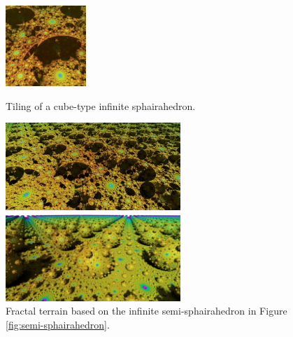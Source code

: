 \begin{figure}[h!tbp]
\begin{minipage}[t]{0.19\textwidth}
  \label{fig:terrainStep10}
 \end{minipage}
 \hspace*{\fill}
 \begin{minipage}[t]{0.19\textwidth}
  \centering
  \includegraphics[height=1.2in, keepaspectratio]{./img/application/sphairahedron/constructFractal/terrainProcess/final.jpg}
  \label{figsphairaPrismFinal}
 \end{minipage}
 \caption{Tiling of a cube-type infinite sphairahedron.}
 \label{fig:sphairahedralPrismTile}
\end{figure}

\begin{figure}[h!tbp]
 \begin{minipage}[t]{0.5\textwidth}
 \centering
 \includegraphics[height=1.3in, keepaspectratio]{./img/application/sphairahedron/constructFractal/terrain.jpg}
 \caption{Fractal terrain besed on the infinite sphairahedron in Figure \ref{fig:sphairahedralPrismTile}.}
 \label{fig:terrain}
 \end{minipage}
 \hspace*{\fill}
 \begin{minipage}[t]{0.5\textwidth}
 \centering
 \includegraphics[height=1.3in, keepaspectratio]{./img/application/sphairahedron/constructFractal/semi-terrain2.png}
 \caption{Fractal terrain based on the infinite semi-sphairahedron in
  Figure \ref{fig:semi-sphairahedron}.}
 \label{fig:semi-terrain}
 \end{minipage}
 \hspace*{\fill}
\end{figure}

